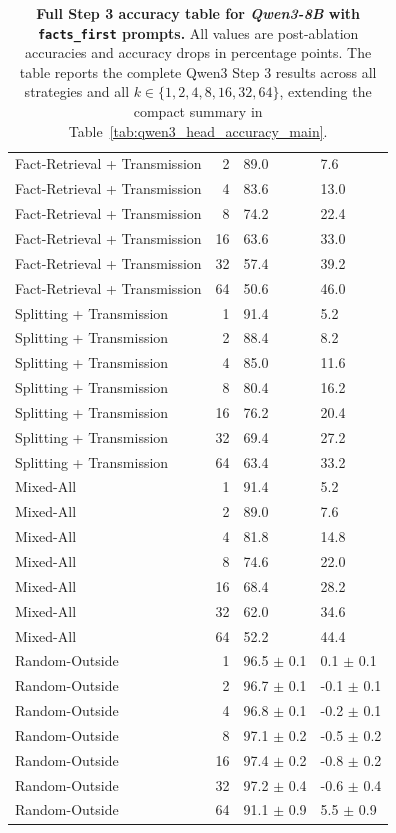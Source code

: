 \documentclass[11pt]{article}
\begin{document}
\begin{table}[p]
{\begin{tabular}{@{} l r l l @{}}
Fact-Retrieval + Transmission & 2 & 89.0 & 7.6 \\
Fact-Retrieval + Transmission & 4 & 83.6 & 13.0 \\
Fact-Retrieval + Transmission & 8 & 74.2 & 22.4 \\
Fact-Retrieval + Transmission & 16 & 63.6 & 33.0 \\
Fact-Retrieval + Transmission & 32 & 57.4 & 39.2 \\
Fact-Retrieval + Transmission & 64 & 50.6 & 46.0 \\
Splitting + Transmission & 1 & 91.4 & 5.2 \\
Splitting + Transmission & 2 & 88.4 & 8.2 \\
Splitting + Transmission & 4 & 85.0 & 11.6 \\
Splitting + Transmission & 8 & 80.4 & 16.2 \\
Splitting + Transmission & 16 & 76.2 & 20.4 \\
Splitting + Transmission & 32 & 69.4 & 27.2 \\
Splitting + Transmission & 64 & 63.4 & 33.2 \\
Mixed-All & 1 & 91.4 & 5.2 \\
Mixed-All & 2 & 89.0 & 7.6 \\
Mixed-All & 4 & 81.8 & 14.8 \\
Mixed-All & 8 & 74.6 & 22.0 \\
Mixed-All & 16 & 68.4 & 28.2 \\
Mixed-All & 32 & 62.0 & 34.6 \\
Mixed-All & 64 & 52.2 & 44.4 \\
Random-Outside & 1 & 96.5 $\pm$ 0.1 & 0.1 $\pm$ 0.1 \\
Random-Outside & 2 & 96.7 $\pm$ 0.1 & -0.1 $\pm$ 0.1 \\
Random-Outside & 4 & 96.8 $\pm$ 0.1 & -0.2 $\pm$ 0.1 \\
Random-Outside & 8 & 97.1 $\pm$ 0.2 & -0.5 $\pm$ 0.2 \\
Random-Outside & 16 & 97.4 $\pm$ 0.2 & -0.8 $\pm$ 0.2 \\
Random-Outside & 32 & 97.2 $\pm$ 0.4 & -0.6 $\pm$ 0.4 \\
Random-Outside & 64 & 91.1 $\pm$ 0.9 & 5.5 $\pm$ 0.9 \\
\bottomrule
\end{tabular}%
}
\caption{\textbf{Full Step 3 accuracy table for \textit{Qwen3-8B} with \texttt{facts\_first} prompts.} All values are post-ablation accuracies and accuracy drops in percentage points. The table reports the complete Qwen3 Step 3 results across all strategies and all $k \in \{1,2,4,8,16,32,64\}$, extending the compact summary in Table~\ref{tab:qwen3_head_accuracy_main}.}
\label{tab:qwen3_8b_ff_full_accuracy}
\end{table}
\end{document}
